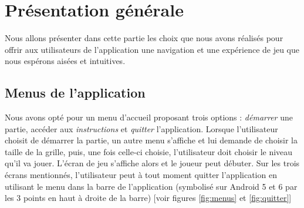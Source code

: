 \documentclass[12pt, a4paper]{article}%
\begin{document}
\section{Présentation générale}
	Nous allons présenter dans cette partie les choix que nous avons réalisés pour offrir aux utilisateurs de l'application une navigation et une expérience de jeu que nous espérons aisées et intuitives.
	
	\subsection{Menus de l'application}
	Nous avons opté pour un menu d'accueil proposant trois options : \textit{démarrer} une partie, accéder aux \textit{instructions} et \textit{quitter} l'application.
	Lorsque l'utilisateur choisit de démarrer la partie, un autre menu s'affiche et lui demande de choisir la taille de la grille, puis, une fois celle-ci choisie, l'utilisateur doit choisir le niveau qu'il va jouer. L'écran de jeu s'affiche alors et le joueur peut débuter. Sur les trois écrans mentionnés, l'utilisateur peut à tout moment quitter l'application en utilisant le menu dans la barre de l'application  (symbolisé sur Android 5 et 6 par les 3 points en haut à droite de la barre) [voir figures \ref{fig:menus} et \ref{fig:quitter}]
\end{document}

